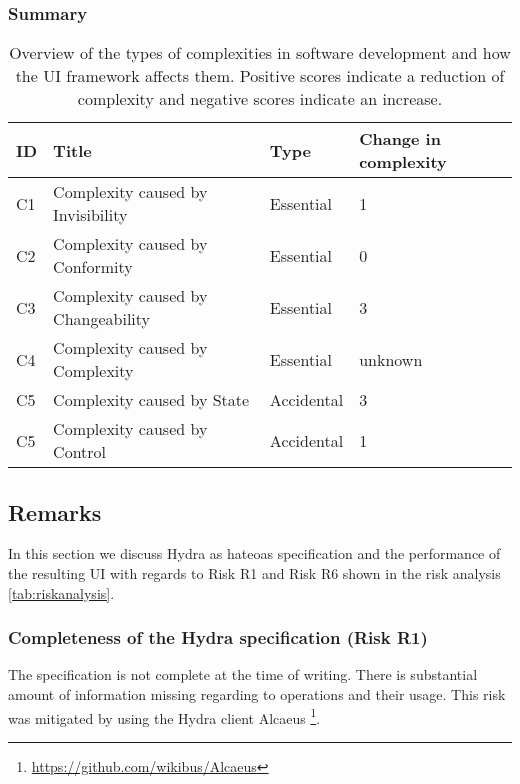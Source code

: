 \subsubsection{Summary}

\begin{table}[!htb]
  \begin{center}
    \begin{tabular}{|l|l|l|l|}
      \hline
      \textbf{ID} & \textbf{Title} & \textbf{Type} & \textbf{Change in complexity} \\
      \hline
      C1 & Complexity caused by Invisibility & Essential & 1 \\
      \hline
      C2 & Complexity caused by Conformity & Essential & 0 \\
      \hline
      C3 & Complexity caused by Changeability & Essential & 3 \\
      \hline
      C4 & Complexity caused by Complexity & Essential & unknown \\
      \hline
      C5 & Complexity caused by State & Accidental & 3 \\
      \hline
      C5 & Complexity caused by Control & Accidental & 1 \\
      \hline
    \end{tabular}
    \caption{Overview of the types of complexities in software development and how the UI framework affects them. Positive scores indicate a reduction of complexity and negative scores indicate an increase.}
    \label{tab:complexitysummary}
  \end{center}
\end{table}

\subsection{Remarks}
In this section we discuss Hydra as \gls{hateoas} specification and the performance of the resulting UI with regards to Risk R1 and Risk R6 shown in the risk analysis \ref{tab:riskanalysis}.

\subsubsection{Completeness of the Hydra specification (Risk R1)}
The specification is not complete at the time of writing. There is substantial amount of information missing regarding to operations and their usage. This risk was mitigated by using the Hydra client Alcaeus \footnote{\url{https://github.com/wikibus/Alcaeus}}.

